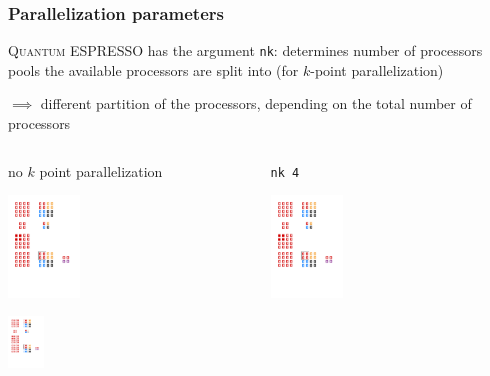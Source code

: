 \documentclass[aspectratio=169]{beamer}
\newcommand{\QE}{\textsc{Quantum} ESPRESSO\xspace}
\begin{document}
\begin{frame}
	\frametitle{Parallelization parameters}

	\QE has the argument \texttt{nk}: determines number of processors pools the available processors are split into (for \(k\)-point parallelization)

	\(\implies\) different partition of the processors, depending on the total number of processors

	\vspace{8pt}
	\begin{columns}
		\begin{column}{0.5\textwidth}
			\centering
			no \(k\) point parallelization

			\centering
			\includegraphics[width=0.3\textwidth]{figs/np16_no_kpoint.pdf}
			
			\centering
			\includegraphics[width=0.15\textwidth]{figs/np4_no_kpoint.pdf}			
		\end{column}

		\begin{column}{0.5\textwidth}
			\centering
			\texttt{nk 4}

			\centering
			\includegraphics[width=0.3\textwidth]{figs/np16_nk_4.pdf}			


\end{column}
\end{columns}
\end{frame}
\end{document}
